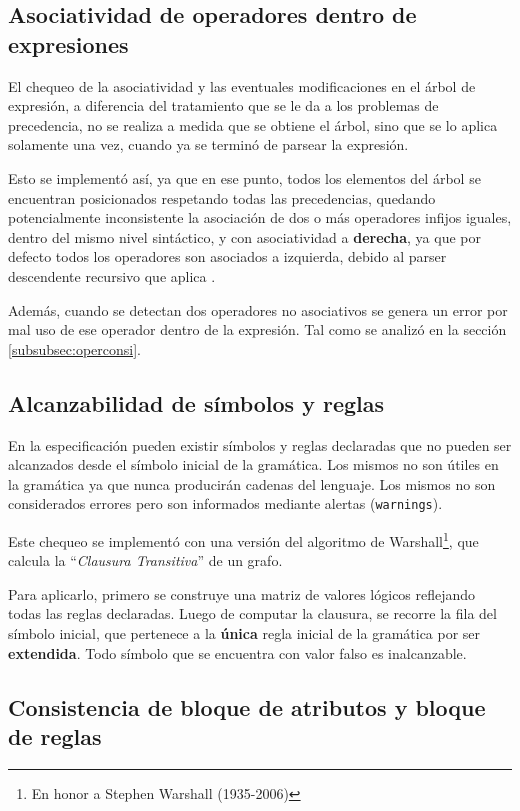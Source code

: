 \subsection{Asociatividad de operadores dentro de expresiones}

El chequeo de la asociatividad y las eventuales modificaciones en el árbol de expresión, a diferencia del tratamiento que se le da a los problemas de precedencia, no se realiza a medida que se obtiene el árbol, sino que se lo aplica solamente una vez, cuando ya se terminó de parsear la expresión.

Esto se implementó así, ya que en ese punto, todos los elementos del árbol se encuentran posicionados respetando todas las precedencias, quedando potencialmente inconsistente la asociación de dos o más operadores infijos iguales, dentro del mismo nivel sintáctico, y con asociatividad a \textbf{derecha}, ya que por defecto todos los operadores son asociados a izquierda, debido al parser descendente recursivo que aplica \spirit.

Además, cuando se detectan dos operadores no asociativos se genera un error por mal uso de ese operador dentro de la expresión. Tal como se analizó en la sección \ref{subsubsec:operconsi}.

\subsection{Alcanzabilidad de símbolos y reglas}

En la especificación pueden existir símbolos y reglas declaradas que no pueden ser alcanzados desde el símbolo inicial de la gramática. Los mismos no son útiles en la gramática ya que nunca producirán cadenas del lenguaje. Los mismos no son considerados errores pero son informados mediante alertas (\texttt{warnings}).

Este chequeo se implementó con una versión del algoritmo de Warshall\footnote{En honor a Stephen Warshall (1935-2006)}, que calcula la ``\textit{Clausura Transitiva}'' de un grafo.

Para aplicarlo, primero se construye una matriz de valores lógicos reflejando todas las reglas declaradas. Luego de computar la clausura, se recorre la fila del símbolo inicial, que pertenece a la \textbf{única} regla inicial de la gramática por ser \textbf{extendida}. Todo símbolo que se encuentra con valor falso es inalcanzable.

\subsection{Consistencia de bloque de atributos y bloque de reglas}

